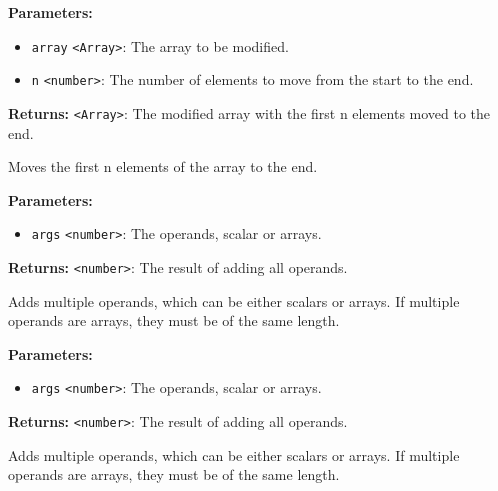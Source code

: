 \documentclass[12pt,a4paper]{article}
\begin{document}
\noindent \textbf{Parameters:}
\begin{itemize}
  \item \texttt{array} \texttt{<Array>}: The array to be modified.
  \item \texttt{n} \texttt{<number>}: The number of elements to move from the start to the end.
\end{itemize}

\noindent \textbf{Returns:} \texttt{<Array>}: The modified array with the first \textasciigrave{}n\textasciigrave{} elements moved to the end.

\noindent Moves the first \textasciigrave{}n\textasciigrave{} elements of the array to the end.

\vspace{5mm}
\noindent {}


\noindent \textbf{Parameters:}
\begin{itemize}
  \item \texttt{args} \texttt{<number>}: The operands, scalar or arrays.
\end{itemize}

\noindent \textbf{Returns:} \texttt{<number>}: The result of adding all operands.

\noindent Adds multiple operands, which can be either scalars or arrays.
If multiple operands are arrays, they must be of the same length.

\vspace{5mm}
\noindent {}


\noindent \textbf{Parameters:}
\begin{itemize}
  \item \texttt{args} \texttt{<number>}: The operands, scalar or arrays.
\end{itemize}

\noindent \textbf{Returns:} \texttt{<number>}: The result of adding all operands.

\noindent Adds multiple operands, which can be either scalars or arrays.
If multiple operands are arrays, they must be of the same length.

\vspace{5mm}
\noindent {}
\end{document}
